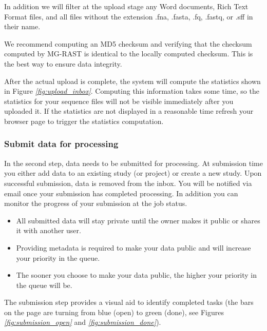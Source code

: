 \documentclass[letterpaper,10pt,english]{sphinxmanual}
\begin{document}
In addition we will filter at the upload stage any Word documents, Rich
Text Format files, and all files without the extension .fna, .fasta,
.fq, .fastq, or .sff in their name.

 We recommend computing an MD5 checksum and verifying that the
checksum computed by MG-RAST is identical to the locally computed
checksum. This is the best way to ensure data integrity.

 After the actual upload is complete, the system will
compute the statistics shown in Figure
{\hyperref[\detokenize{faq:fig:upload_inbox}]{\emph{{[}fig:upload\_inbox{]}}}}. Computing this information
takes some time, so the statistics for your sequence files will not be
visible immediately after you uploaded it. If the statistics are not
displayed in a reasonable time refresh your browser page to trigger the
statistics computation.


\subsubsection{Submit data for processing}
\label{\detokenize{faq:submit-data-for-processing}}
In the second step, data needs to be submitted for processing. At
submission time you either add data to an existing study (or project) or
create a new study. Upon successful submission, data is removed from the
inbox. You will be notified via email once your submission has completed
processing. In addition you can monitor the progress of your submission
at the job status.
\begin{itemize}
\item {} 
All submitted data will stay private until the owner makes it public
or shares it with another user.

\item {} 
Providing metadata is required to make your data public and will
increase your priority in the queue.

\item {} 
The sooner you choose to make your data public, the higher your
priority in the queue will be.

\end{itemize}

The submission step provides a visual aid to identify completed tasks
(the bars on the page are turning from blue (open) to green (done), see
Figures {\hyperref[\detokenize{faq:fig:submission_open}]{\emph{{[}fig:submission\_open{]}}}} and
{\hyperref[\detokenize{faq:fig:submission_done}]{\emph{{[}fig:submission\_done{]}}}}).
\end{document}
